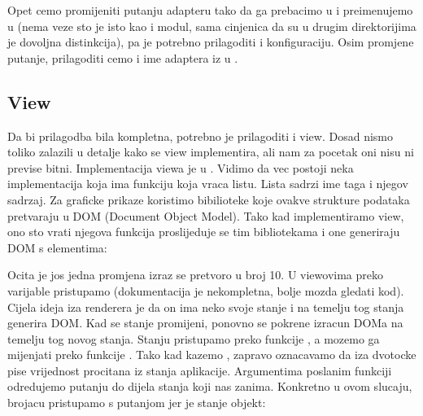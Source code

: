 \documentclass[letterpaper,10pt,croatian]{sphinxmanual}
\begin{document}
\sphinxAtStartPar
Opet cemo promijeniti putanju adapteru tako da ga prebacimo u
 i preimenujemo u  (nema veze sto je isto
kao i modul, sama cinjenica da su u drugim direktorijima je dovoljna
distinkcija), pa je potrebno prilagoditi i konfiguraciju. Osim promjene
putanje, prilagoditi cemo i ime adaptera iz  u .


\subsection{View}
\label{\detokenize{03-hat-modbus-workshop/index:view}}
\sphinxAtStartPar
Da bi prilagodba bila kompletna, potrebno je prilagoditi i view. Dosad nismo
toliko zalazili u detalje kako se view implementira, ali nam za pocetak oni
nisu ni previse bitni. Implementacija viewa je u
. Vidimo da vec postoji neka implementacija koja
ima funkciju  koja vraca listu. Lista sadrzi ime taga i njegov sadrzaj.
Za graficke prikaze koristimo bibilioteke koje ovakve strukture podataka
pretvaraju u DOM (Document Object Model). Tako kad implementiramo view, ono sto
vrati njegova funkcija proslijeduje se tim bibliotekama i one generiraju DOM s
elementima:

\begin{sphinxVerbatim}[commandchars=\\\{\}]
 
\end{sphinxVerbatim}

\sphinxAtStartPar
Ocita je jos jedna promjena \sphinxhyphen{} izraz 
se pretvoro u broj 10. U viewovima preko varijable  pristupamo  (dokumentacija je nekompletna,
bolje mozda gledati kod). Cijela ideja iza renderera je da on ima neko svoje
stanje i na temelju tog stanja generira DOM. Kad se stanje promijeni, ponovno
se pokrene izracun DOM\sphinxhyphen{}a na temelju tog novog stanja. Stanju pristupamo preko
funkcije , a mozemo ga mijenjati preko funkcije . Tako kad
kazemo , zapravo oznacavamo
da iza dvotocke pise vrijednost procitana iz stanja aplikacije. Argumentima
poslanim  funkciji odredujemo putanju do dijela stanja koji nas
zanima. Konkretno u ovom slucaju, brojacu pristupamo s putanjom
 jer je stanje objekt:
\end{document}
